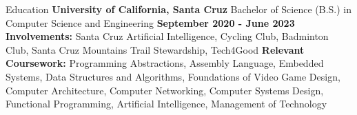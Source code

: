 \documentclass{resume}
\begin{document}
\begin{rSection}{\large Education}
\textbf{University of California, Santa Cruz} Bachelor of Science (B.S.) in Computer Science and Engineering \hfill {\bf{September 2020 - June 2023}} \\
\textbf{Involvements:}  Santa Cruz Artificial Intelligence, Cycling Club, Badminton Club, Santa Cruz Mountains Trail Stewardship, Tech4Good 
\textbf{Relevant Coursework:} Programming Abstractions, Assembly Language, Embedded Systems, Data Structures and Algorithms, Foundations of Video Game Design, Computer Architecture, Computer Networking, Computer Systems Design, Functional Programming, Artificial Intelligence, Management of Technology  \\

\end{rSection}
\end{document}
